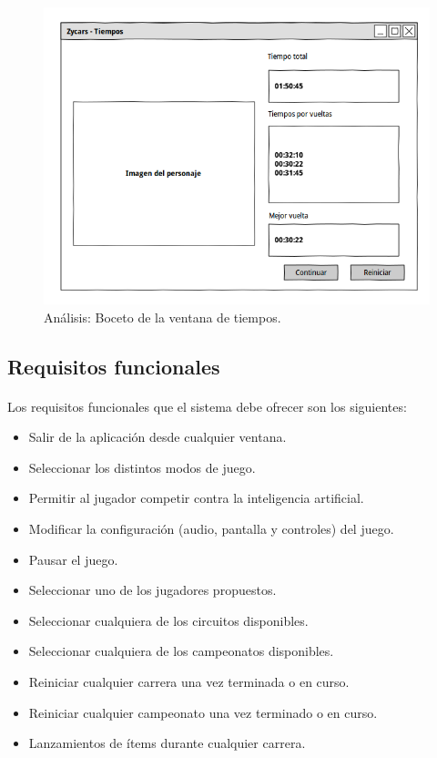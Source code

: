 \begin{description}
        \begin{figure}[H]
          \label{diagrama_casos_uso}
          \begin{center}
            \includegraphics[scale=0.42]{imagenes/analisis/boceto_tiempos.png}
          \end{center}
          \caption{Análisis: Boceto de la ventana de tiempos.}
        \end{figure}
    
\end{description}

\subsection{Requisitos funcionales}

\paragraph{}
Los requisitos funcionales que el sistema debe ofrecer son los siguientes:

\begin{itemize}
    \item Salir de la aplicación desde cualquier ventana.
    \item Seleccionar los distintos modos de juego.
    \item Permitir al jugador competir contra la inteligencia artificial.
    \item Modificar la configuración (audio, pantalla y controles) del juego.
    \item Pausar el juego.
    \item Seleccionar uno de los jugadores propuestos.
    \item Seleccionar cualquiera de los circuitos disponibles.
    \item Seleccionar cualquiera de los campeonatos disponibles.
    \item Reiniciar cualquier carrera una vez terminada o en curso.
    \item Reiniciar cualquier campeonato una vez terminado o en curso.
    \item Lanzamientos de ítems durante cualquier carrera.
\end{itemize}

